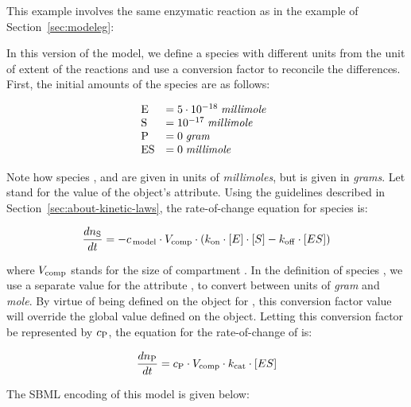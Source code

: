 This example involves the same enzymatic reaction as in the
example of Section~\ref{sec:modeleg}:
\begin{center}
\end{center}
In this version of the model, we define a species with different
units from the unit of extent of the reactions and use a
conversion factor to reconcile the differences.  First, the
initial amounts of the species are as follows:
\begin{linenomath}
  \begin{equation*}
    \begin{array}{@{}lll@{}}
      \textrm{E}   & = 5 \cdot 10^{-18}\; \emph{millimole} \\
      \textrm{S}   & = 10^{-17}\; \emph{millimole} \\
      \textrm{P}   & = 0\; \emph{gram} \\
      \textrm{ES}  & = 0\; \emph{millimole} \\
    \end{array}
  \end{equation*}
\end{linenomath}
Note how species ,  and  are given in units
of \emph{millimoles}, but  is given in \emph{grams}.  Let
\csg stand for the value of the \Model object's
 attribute.  Using the guidelines
described in Section~\ref{sec:about-kinetic-laws}, the
rate-of-change equation for species  is:
\begin{linenomath}
\begin{equation*}
  \dfrac{d n\sub{S}}{d t} = - \csg \cdot V\sub{comp} \cdot (k\sub{on} \cdot [E] \cdot [S] - k\sub{off} \cdot [ES])
\end{equation*}
\end{linenomath}
where $V\sub{comp}$ stands for the size of compartment .
In the definition of species , we use a separate value for
the attribute , to convert between units of
\emph{gram} and \emph{mole}.  By virtue of being defined on the
\Species object for , this conversion factor value will
override the global value defined on the \Model object.  Letting
this conversion factor be represented by $c\sub{P}$, the equation
for the rate-of-change of  is:
\begin{linenomath}
\begin{equation*}
  \dfrac{d n\sub{P}}{d t} = c\sub{P} \cdot V\sub{comp} \cdot k\sub{cat} \cdot [ES]
\end{equation*}
\end{linenomath}
The SBML encoding of this model is given below:

